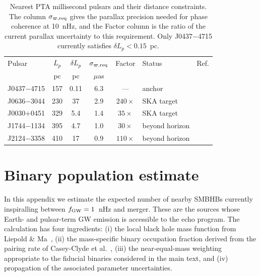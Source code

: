 \documentclass[aps,prx,twocolumn,superscriptaddress,nofootinbib,longbibliography]{revtex4-2}
\begin{document}
\begin{table}[t]
\caption{Nearest PTA millisecond pulsars and their distance constraints. The column $\sigma_{\varpi,\rm req}$ gives the parallax precision needed for phase coherence at 10~nHz, and the Factor column is the ratio of the current parallax uncertainty to this requirement. Only J0437$-$4715 currently satisfies $\delta L_p < 0.15$~pc.}\label{tab:anchors}
\centering
\begin{tabular}{lccccll}
\hline\hline
Pulsar & $L_p$ & $\delta L_p$ & $\sigma_{\varpi,\rm req}$ & Factor & Status & Ref. \\
       & pc    & pc           & $\mu$as                    &        &        &      \\
\hline
J0437$-$4715  & 157 & 0.11 & 6.3 & --- & anchor & \cite{Reardon2024} \\
J0636$-$3044  & 230 & 37 & 2.9 & $240\times$ & SKA target & \cite{Shamohammadi2024} \\
J0030$+$0451  & 329 & 5.4 & 1.4 & $35\times$ & SKA target & \cite{Ding2023} \\
J1744$-$1134  & 395 & 4.7 & 1.0 & $30\times$ & beyond horizon & \cite{Deller2019} \\
J2124$-$3358  & 410 & 17 & 0.9 & $110\times$ & beyond horizon & \cite{Deller2019} \\
\hline\hline
\end{tabular}
\end{table}

\section{Binary population estimate}\label{app:population_estimate}

In this appendix we estimate the expected number of nearby SMBHBs currently inspiralling between $f_{\rm GW}=1$~nHz and merger. These are the sources whose Earth- and pulsar-term GW emission is accessible to the echo program. The calculation has four ingredients: (i) the local black hole mass function from Liepold \& Ma~\cite{LiepoldMa2024}, (ii) the mass-specific binary occupation fraction derived from the pairing rate of Casey-Clyde et al.~\cite{CaseyClyde2025}, (iii) the near-equal-mass weighting appropriate to the fiducial binaries considered in the main text, and (iv) propagation of the associated parameter uncertainties.
\end{document}
